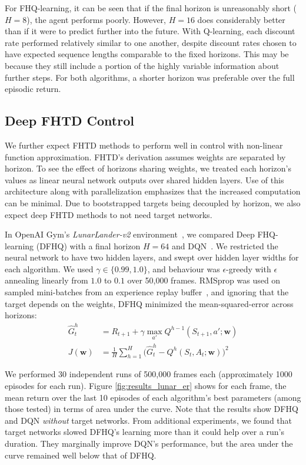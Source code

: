 \documentclass[letterpaper]{article} %
\newcommand{\params}{\mathbf{w}}
\begin{document}
For FHQ-learning, it can be seen that if the final horizon is unreasonably short ($H = 8$), the agent performs poorly. However, $H = 16$ does considerably better than if it were to predict further into the future. With Q-learning, each discount rate performed relatively similar to one another, despite discount rates chosen to have expected sequence lengths comparable to the fixed horizons. This may be because they still include a portion of the highly variable information about further steps. For both algorithms, a shorter horizon was preferable over the full episodic return.

\subsection{Deep FHTD Control}
\label{subsec:deepFHTDcontrol}

We further expect FHTD methods to perform well in control with non-linear function approximation. FHTD's derivation assumes weights are separated by horizon. To see the effect of horizons sharing weights, we treated each horizon's values as linear neural network outputs over shared hidden layers. Use of this architecture along with parallelization emphasizes that the increased computation can be minimal. Due to bootstrapped targets being decoupled by horizon, we also expect deep FHTD methods to not need target networks.

In OpenAI Gym's \textit{LunarLander-v2} environment~\cite{gym2016}, we compared Deep FHQ-learning (DFHQ) with a final horizon $H = 64$ and DQN~\cite{dqn2015}. We restricted the neural network to have two hidden layers, and swept over hidden layer widths for each algorithm. We used $\gamma \in \{0.99, 1.0\}$, and behaviour was $\epsilon$-greedy with $\epsilon$ annealing linearly from $1.0$ to $0.1$ over 50,000 frames. RMSprop \cite{rmsprop2012} was used on sampled mini-batches from an experience replay buffer~\cite{dqn2015}, and ignoring that the target depends on the weights, DFHQ minimized the mean-squared-error across horizons:
\begin{align}
    \hat{G}_{t}^{h} &= R_{t+1} + \gamma\max_{a'}{Q^{h-1}(S_{t+1}, a'; \params)} \nonumber \\
    J(\params) &= \frac{1}{H}\sum_{h = 1}^{H}{\bigg(\hat{G}_{t}^{h} - Q^h(S_t, A_t; \params)\bigg)^2}
\end{align}

We performed 30 independent runs of 500,000 frames each (approximately 1000 episodes for each run). Figure \ref{fig:results_lunar_er} shows for each frame, the mean return over the last 10 episodes of each algorithm's best parameters (among those tested) in terms of area under the curve. Note that the results show DFHQ and DQN \textit{without} target networks. From additional experiments, we found that target networks slowed DFHQ's learning more than it could help over a run's duration. They marginally improve DQN's performance, but the area under the curve remained well below that of DFHQ.
\end{document}
